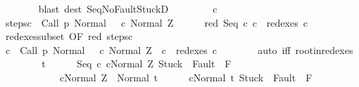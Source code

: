 \begin{isabellebody}
\ \ \ \ \ \ \isamarkupfalse%
\ {\isacharparenleft}blast\ dest{\isacharcolon}\ Seq{\isacharunderscore}NoFaultStuckD{}{\isacharparenright}\isanewline
\ \ \isamarkupfalse%
\isanewline
\ \ \ \ \isamarkupfalse%
\ c{\isacharprime}\isanewline
\ \ \ \ \isamarkupfalse%
\ steps{\isacharunderscore}c{\isacharprime}{\isacharcolon}\ {\isachardoublequoteopen}{\isasymGamma}{\isasymturnstile}\ {\isacharparenleft}Call\ p{\isacharcomma}\ Normal\ {\isasymsigma}{\isacharparenright}\ {\isasymrightarrow}\isactrlsup {\isacharplus}\ {\isacharparenleft}c{\isacharprime}{\isacharcomma}\ Normal\ Z{\isacharparenright}{\isachardoublequoteclose}\isanewline
\ \ \ \ \isamarkupfalse%
\ red{\isacharcolon}\ {\isachardoublequoteopen}Seq\ c{}\ c{}\ {\isasymin}\ redexes\ c{\isacharprime}{\isachardoublequoteclose}\isanewline
\ \ \ \ \isamarkupfalse%
\ redexes{\isacharunderscore}subset\ {\isacharbrackleft}OF\ red{\isacharbrackright}\ steps{\isacharunderscore}c{\isacharprime}\isanewline
\ \ \ \ \isamarkupfalse%
\ {\isachardoublequoteopen}{\isasymexists}c{\isacharprime}{\isachardot}\ {\isasymGamma}{\isasymturnstile}\ {\isacharparenleft}Call\ p{\isacharcomma}\ Normal\ {\isasymsigma}{\isacharparenright}\ {\isasymrightarrow}\isactrlsup {\isacharplus}\ {\isacharparenleft}c{\isacharprime}{\isacharcomma}\ Normal\ Z{\isacharparenright}\ {\isasymand}\ c{}\ {\isasymin}\ redexes\ c{\isacharprime}{\isachardoublequoteclose}\isanewline
\ \ \ \ \ \ \isamarkupfalse%
\ {\isacharparenleft}auto\ iff{\isacharcolon}\ root{\isacharunderscore}in{\isacharunderscore}redexes{\isacharparenright}\isanewline
\ \ \isamarkupfalse%
\isanewline
\ \ \ \ \isamarkupfalse%
\ t\isanewline
\ \ \ \ \isamarkupfalse%
\ {\isachardoublequoteopen}{\isasymGamma}{\isasymturnstile}{\isasymlangle}Seq\ c{}\ c{}{\isacharcomma}Normal\ Z{\isasymrangle}\ {\isasymRightarrow}{\isasymnotin}{\isacharparenleft}{\isacharbraceleft}Stuck{\isacharbraceright}\ {\isasymunion}\ Fault\ {\isacharbackquote}\ {\isacharparenleft}{\isacharminus}F{\isacharparenright}{\isacharparenright}{\isachardoublequoteclose}\ \isanewline
\ \ \ \ \ \ \ \ \ \ \ \ {\isachardoublequoteopen}{\isasymGamma}{\isasymturnstile}{\isasymlangle}c{}{\isacharcomma}Normal\ Z{\isasymrangle}\ {\isasymRightarrow}\ Normal\ t{\isachardoublequoteclose}\isanewline
\ \ \ \ \isamarkupfalse%
\ {\isachardoublequoteopen}{\isasymGamma}{\isasymturnstile}{\isasymlangle}c{}{\isacharcomma}Normal\ t{\isasymrangle}\ {\isasymRightarrow}{\isasymnotin}{\isacharparenleft}{\isacharbraceleft}Stuck{\isacharbraceright}\ {\isasymunion}\ Fault\ {\isacharbackquote}\ {\isacharparenleft}{\isacharminus}F{\isacharparenright}{\isacharparenright}{\isachardoublequoteclose}\isanewline

\end{isabellebody}
